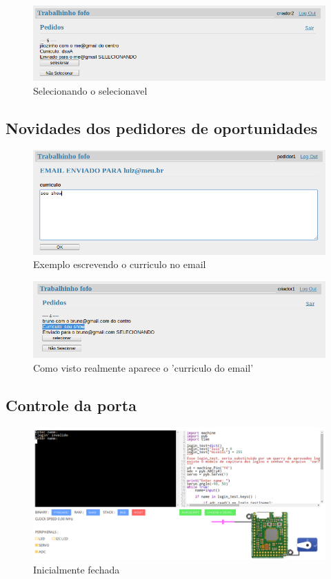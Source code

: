 \documentclass[12pt]{article}
\begin{document}
\begin{figure}[ht]
\centering
\includegraphics[width=.5\textwidth]{imagens/selecao2.png}
\caption{Selecionando o selecionavel}
\end{figure}

\clearpage
\subsection{Novidades dos pedidores de oportunidades}

\begin{figure}[ht]
\centering
\includegraphics[width=.5\textwidth]{imagens/email.png}
\caption{Exemplo escrevendo o curriculo no email}
\end{figure}

\begin{figure}[ht]
\centering
\includegraphics[width=.5\textwidth]{imagens/curriculo.png}
\caption{Como visto realmente aparece o 'curriculo do email'}
\end{figure}


\clearpage
\subsection{Controle da porta}

\begin{figure}[ht]
\centering
\includegraphics[width=.5\textwidth]{imagens/fechada.png}
\caption{Inicialmente fechada}
\end{figure}
\end{document}
